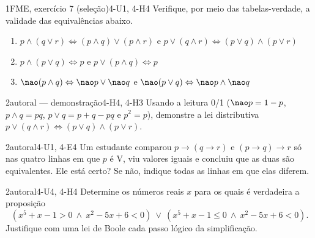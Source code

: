\begin{questao}{1}{FME, exercício 7 (seleção)}{4-U1, 4-H4}\label{u4:q4}
Verifique, por meio das tabelas-verdade, a validade das equivalências abaixo.
\begin{enumerate}[label=\alph*)]
  \item $p\wedge(q\vee r)\Leftrightarrow(p\wedge q)\vee(p\wedge r)$ \quad e \quad $p\vee(q\wedge r)\Leftrightarrow(p\vee q)\wedge(p\vee r)$
  \item $p\wedge(p\vee q)\Leftrightarrow p$ \quad e \quad $p\vee(p\wedge q)\Leftrightarrow p$
  \item ${\nao}(p\wedge q)\Leftrightarrow{\nao}p\vee{\nao}q$ \quad e \quad ${\nao}(p\vee q)\Leftrightarrow{\nao}p\wedge{\nao}q$
\end{enumerate}
\end{questao}

\begin{questao}{2}{autoral — demonstração}{4-H4, 4-H3}\label{u4:q5}
Usando a leitura 0/1 (${\nao}p=1-p$, $p\wedge q=pq$, $p\vee q=p+q-pq$ e $p^2=p$), demonstre a lei distributiva $p\vee(q\wedge r)\Leftrightarrow(p\vee q)\wedge(p\vee r)$.
\end{questao}

\begin{questao}{2}{autoral}{4-U1, 4-E4}\label{u4:q6}
Um estudante comparou $p\rightarrow(q\rightarrow r)$ e $(p\rightarrow q)\rightarrow r$ só nas quatro linhas em que $p$ é V, viu valores iguais e concluiu que as duas são equivalentes. Ele está certo? Se não, indique todas as linhas em que elas diferem.
\end{questao}

\begin{questao}[integradora]{2}{autoral}{4-U4, 4-H4}\label{u4:q7}
Determine os números reais $x$ para os quais é verdadeira a proposição
\[(x^5+x-1>0\ \wedge\ x^2-5x+6<0)\ \vee\ (x^5+x-1\le0\ \wedge\ x^2-5x+6<0).\]
Justifique com uma lei de Boole cada passo lógico da simplificação.
\end{questao}

